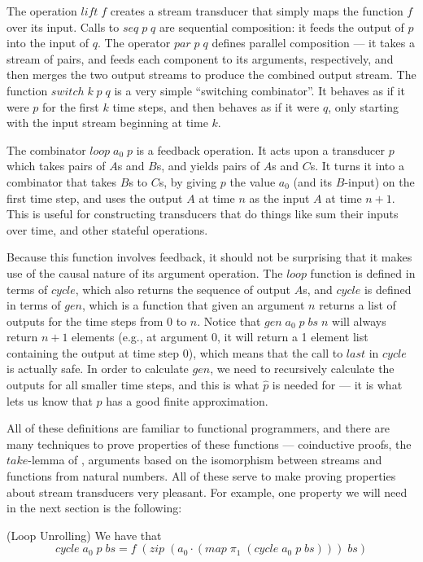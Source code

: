The operation $lift\;f$ creates a stream transducer that simply maps
the function $f$ over its input. Calls to $seq\;p\;q$ are sequential
composition: it feeds the output of $p$ into the input of $q$. The
operator $par\;p\;q$ defines parallel composition --- it takes a
stream of pairs, and feeds each component to its arguments,
respectively, and then merges the two output streams to produce the
combined output stream. The function $switch\;k\;p\;q$ is a very
simple ``switching combinator''.  It behaves as if it were $p$ for the
first $k$ time steps, and then behaves as if it were $q$, only
starting with the input stream beginning at time $k$.

The combinator $loop\;a_0\;p$ is a feedback operation. It acts
upon a transducer $p$ which takes pairs of $A$s and $B$s, and yields
pairs of $A$s and $C$s. It turns it into a combinator that takes $B$s
to $C$s, by giving $p$ the value $a_0$ (and its $B$-input) on the
first time step, and uses the output $A$ at time $n$ as the input $A$
at time $n+1$. This is useful for constructing transducers that do
things like sum their inputs over time, and other stateful operations. 

Because this function involves feedback, it should not be surprising
that it makes use of the causal nature of its argument operation. The
$loop$ function is defined in terms of $cycle$, which also returns the
sequence of output $A$s, and $cycle$ is defined in terms of $gen$,
which is a function that given an argument $n$ returns a list of
outputs for the time steps from $0$ to $n$. Notice that
$gen\;a_0\;p\;bs\;n$ will always return $n+1$ elements (e.g., at
argument 0, it will return a 1 element list containing the output at
time step 0), which means that the call to $last$ in $cycle$ is
actually safe. In order to calculate $gen$, we need to recursively
calculate the outputs for all smaller time steps, and this is what
$\hat{p}$ is needed for --- it is what lets us know that $p$ has a good
finite approximation.

All of these definitions are familiar to functional programmers, and
there are many techniques to prove properties of these functions ---
coinductive proofs, the $take$-lemma of \citet{bird-wadler}, arguments based on
the isomorphism between streams and functions from natural
numbers. All of these serve to make proving properties about stream
transducers very pleasant. For example, one property we will need in
the next section is the following:

\begin{lemma}{(Loop Unrolling)} We have that 
  \begin{displaymath}
    cycle\;a_0\;p\;bs = f\;(zip\;(a_0\cdot(map\;\pi_1\;(cycle\;a_0\;p\;bs)))\;bs)
  \end{displaymath}
\end{lemma}

